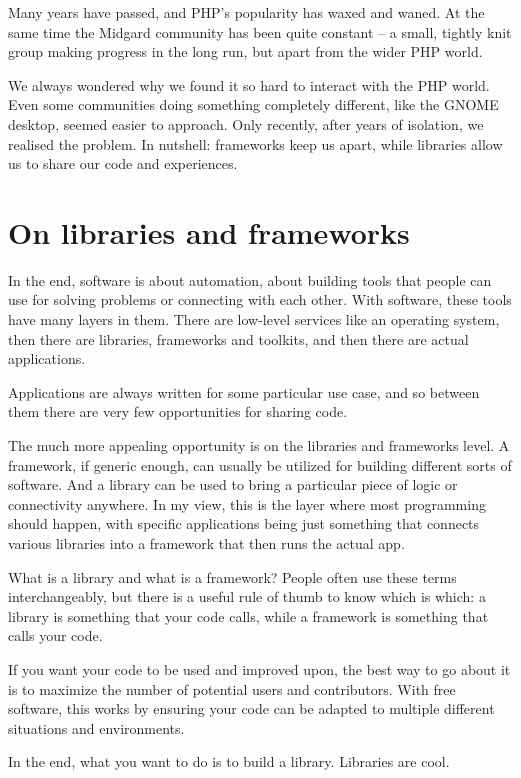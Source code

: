 Many years have passed, and PHP’s popularity has waxed and waned. At the same
time the Midgard community has been quite constant -- a small, tightly knit
group making progress in the long run, but apart from the wider PHP
world.

We always wondered why we found it so hard to interact with the PHP world. Even
some communities doing something completely different, like the GNOME desktop,
seemed easier to approach. Only recently, after years of isolation, we realised
the problem. In nutshell: frameworks keep us apart, while libraries allow us to
share our code and experiences.

\section*{On libraries and frameworks}

In the end, software is about automation, about building tools that people can
use for solving problems or connecting with each other. With software, these
tools have many layers in them. There are low-level services like an operating
system, then there are libraries, frameworks and toolkits, and then there are
actual applications.

Applications are always written for some particular use case, and so between
them there are very few opportunities for sharing code.

The much more appealing opportunity is on the libraries and frameworks level. A
framework, if generic enough, can usually be utilized for building different
sorts of software. And a library can be used to bring a particular piece of
logic or connectivity anywhere. In my view, this is the layer where most
programming should happen, with specific applications being just something that
connects various libraries into a framework that then runs the actual app.

What is a library and what is a framework? People often use these terms
interchangeably, but there is a useful rule of thumb to know which is which: a
library is something that your code calls, while a framework is something that
calls your code.

If you want your code to be used and improved upon, the best way to go about it
is to maximize the number of potential users and contributors. With free
software, this works by ensuring your code can be adapted to multiple different
situations and environments.

In the end, what you want to do is to build a library. Libraries are cool.

